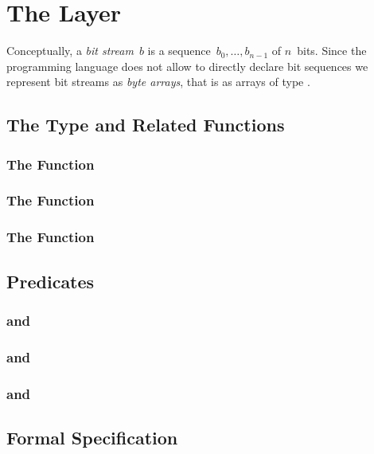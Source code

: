 

\chapter{The  Layer}

Conceptually, a \emph{bit stream}~$b$ is a sequence~$b_0,\ldots,b_{n-1}$ of $n$~bits.
Since the \isoc programming language does not allow to directly declare bit sequences
we represent bit streams as \emph{byte arrays}, that is as arrays of type .

\section{The Type \bitstream and Related Functions}
\subsection{The Function \bitstreamread}
\subsection{The Function }
\subsection{The Function }

\section{Predicates}
\subsection{ and }
\subsection{ and }
\subsection{ and }
\subsection{}

\section{Formal Specification}
